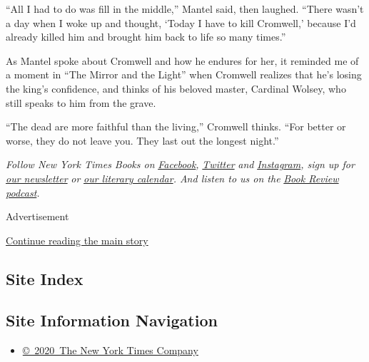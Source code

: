 ``All I had to do was fill in the middle,'' Mantel said, then laughed.
``There wasn't a day when I woke up and thought, `Today I have to kill
Cromwell,' because I'd already killed him and brought him back to life
so many times.''

As Mantel spoke about Cromwell and how he endures for her, it reminded
me of a moment in ``The Mirror and the Light'' when Cromwell realizes
that he's losing the king's confidence, and thinks of his beloved
master, Cardinal Wolsey, who still speaks to him from the grave.

``The dead are more faithful than the living,'' Cromwell thinks. ``For
better or worse, they do not leave you. They last out the longest
night.''

\emph{Follow New York Times Books on}
\href{https://www.facebookcorewwwi.onion/nytbooks/}{\emph{Facebook}}\emph{,}
\href{https://twitter.com/nytimesbooks}{\emph{Twitter}} \emph{and}
\href{https://www.instagram.com/nytbooks/}{\emph{Instagram}}\emph{, sign
up for}
\href{https://www.nytimes3xbfgragh.onion/newsletters/books-review}{\emph{our
newsletter}} \emph{or}
\href{https://www.nytimes3xbfgragh.onion/interactive/2017/books/books-calendar.html}{\emph{our
literary calendar}}\emph{. And listen to us on the}
\href{https://www.nytimes3xbfgragh.onion/column/book-review-podcast}{\emph{Book
Review podcast}}\emph{.}

Advertisement

\protect\hyperlink{after-bottom}{Continue reading the main story}

\hypertarget{site-index}{%
\subsection{Site Index}\label{site-index}}

\hypertarget{site-information-navigation}{%
\subsection{Site Information
Navigation}\label{site-information-navigation}}

\begin{itemize}
\tightlist
\item
  \href{https://help.nytimes3xbfgragh.onion/hc/en-us/articles/115014792127-Copyright-notice}{©~2020~The
  New York Times Company}
\end{itemize}

